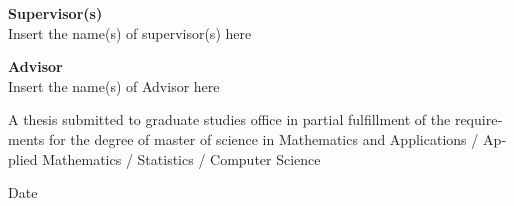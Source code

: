 \documentclass[12pt]{report}
\begin{document}
\begin{latin}
{\begin{center}
\textbf{Supervisor(s)\\} Insert the name(s) of supervisor(s) here
\end{center}

\begin{center}
\textbf{Advisor\\} Insert the name(s) of Advisor here
\end{center}

}
\vfill
\begin{center}
{\small A thesis submitted to graduate studies office
in partial fulfillment of the requirements for the degree of master of science in Mathematics and Applications / Applied Mathematics /
Statistics / Computer Science}
\end{center}

\begin{center}
Date
\end{center}


\end{latin}
\end{document}
